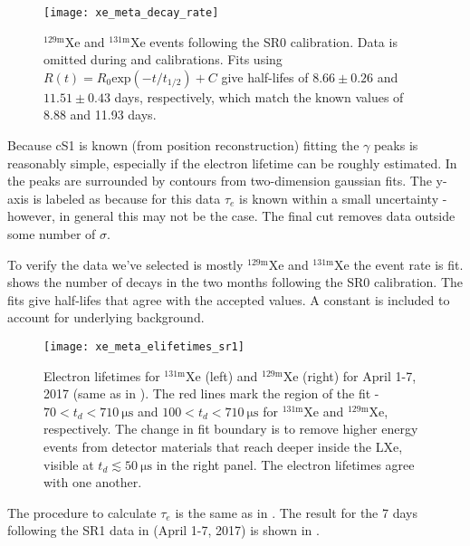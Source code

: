 \begin{figure}
\centering
\texttt{[image: xe\_meta\_decay\_rate]}
\caption{$\mathrm{^{129m}Xe}$ and $\mathrm{^{131m}Xe}$ events following the SR0 \ambe calibration.  Data is omitted during \metakr
and  calibrations.  Fits using $R(t) = R_0 \mathrm{exp}(-t/t_{1/2}) + C$ give half-lifes of $8.66 \pm 0.26$ and
$11.51 \pm 0.43$ days, respectively, which match the known values of 8.88 and 11.93 days.}
\label{fig:electron_lifetimes_measurement_gammas_decay_rate}
\end{figure}

Because cS1 is known (from position reconstruction) fitting the $\gamma$ peaks is reasonably simple, especially if the electron lifetime
can be roughly estimated.  In
 the peaks are surrounded by contours from two-dimension gaussian fits.  The
y-axis is labeled as \cstwob because for this data $\tau_e$ is known within a small uncertainty - however, in general this may not be
the case.  The final cut removes data outside some number of $\sigma$.

To verify the data we've selected is mostly $\mathrm{^{129m}Xe}$ and $\mathrm{^{131m}Xe}$ the event rate is
fit.  shows the number of decays in the two months following the
SR0 \ambe calibration.  The fits give half-lifes that agree with the accepted values.  A constant is included to account for underlying
background.

\begin{figure}
\centering
\texttt{[image: xe\_meta\_elifetimes\_sr1]}
\caption{Electron lifetimes for $\mathrm{^{131m}Xe}$ (left) and $\mathrm{^{129m}Xe}$ (right) for April 1-7, 2017 (same as in
).  The red lines mark the region of the fit - $70 < t_d < 710\ \mathrm{\mu s}$
and $100 < t_d < 710\ \mathrm{\mu s}$ for $\mathrm{^{131m}Xe}$ and $\mathrm{^{129m}Xe}$, respectively.  The change in fit boundary is to
remove higher energy events from detector materials that reach deeper inside the LXe, visible at $t_d \lesssim 50\ \mathrm{\mu s}$ in the
right panel.  The electron lifetimes agree with one another.}
\label{fig:electron_lifetimes_measurement_gammas_elifetime}
\end{figure}

The procedure to calculate $\tau_e$ is the same as in .  The result for the
7 days following the SR1 \ambe data in  (April 1-7, 2017)
is shown in .

